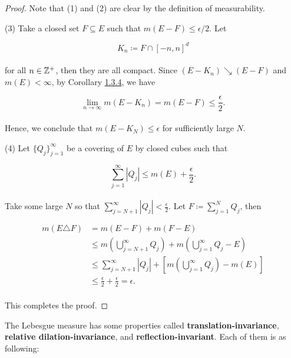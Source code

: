 \documentclass[12pt, a4paper, openany, twoside]{book}
\theoremstyle{definition}
\theoremstyle{remark}
\theoremstyle{plain}
\numberwithin{equation}{section}
\begin{document}
\begin{proof}
    Note that (1) and (2) are clear by the definition of measurability.

    \vspace{5mm}
    (3) Take a closed set $F\subseteq E$ such that $m(E-F)\leq\epsilon/2$. Let 

    \[K_n\coloneqq F\cap [-n,n]^d\]
    \\
    for all $n\in{\mathbb {Z}}^+$, then they are all compact. Since $(E-K_n)\searrow (E-F)$ and $m(E)<\infty$, by Corollary \hyperref[Corollary 1.3.4]{1.3.4}, we have 

    \[\lim_{n\rightarrow\infty}{m(E-K_n)}=m(E-F)\leq\frac{\epsilon}{2}.\]
    \\
    Hence, we conclude that $m(E-K_N)\leq \epsilon$ for sufficiently large $N$.

    \vspace{5mm}
    (4) Let $\{Q_j\}_{j=1}^{\infty}$ be a covering of $E$ by closed cubes such that 

    \[\sum_{j=1}^{\infty}{|Q_j|}\leq m(E)+\frac{\epsilon}{2}.\]
    \\
    Take some large $N$ so that $\sum_{j=N+1}^{\infty}{|Q_j|}<\frac{\epsilon}{2}$. Let $F\coloneqq\sum_{j=1}^{N}{Q_j}$, then

    \begin{align*}
        m(E\triangle F) &= m(E-F) + m(F-E)\\
        &\leq m\left(\bigcup_{j=N+1}^{\infty}{Q_j}\right)+m\left(\bigcup_{j=1}^{\infty}{Q_j}-E\right)\\
        &\leq \sum_{j=N+1}^{\infty}{|Q_j|}+\left[m\left(\bigcup_{j=1}^{\infty}{Q_j}\right)-m(E)\right]\\
        &\leq \frac{\epsilon}{2}+\frac{\epsilon}{2}=\epsilon.
    \end{align*}
    \\
    This completes the proof.
\end{proof}
\vspace{5mm}

The Lebesgue measure has some properties called \textbf{translation-invariance}, \textbf{relative dilation-invariance}, and \textbf{reflection-invariant}. Each of them is as following:
\end{document}
